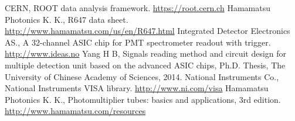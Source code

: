 \documentclass{nst}
\begin{document}
\begin{thebibliography}{99}
	 CERN,  ROOT data analysis framework. \href{https://root.cern.ch/}{https://root.cern.ch}
	 Hamamatsu Photonics K. K., R647 data sheet.
	\href{http://www.hamamatsu.com/us/en/R647.html}{http://www.hamamatsu.com/us/en/R647.html}
	 Integrated Detector Electronics AS., A 32-channel ASIC chip for PMT spectrometer readout with trigger. \href{http://www.ideas.no/products/ide3160-2/}{http://www.ideas.no}
	 Yang H B, Signals reading method and circuit design for multiple detection unit based on the advanced {ASIC} chips, Ph.D. Thesis, The University of Chinese Academy of Sciences, 2014.
	 National Instruments Co.,  National Instruments {VISA} library. \href{http://www.ni.com/visa/}{http://www.ni.com/visa}
	 Hamamatsu Photonics K. K., Photomultiplier tubes: basics and applications, 3rd edition.
	\href{http://www.hamamatsu.com/resources/pdf/etd/PMT_handbook_v3aE.pdf}{http://www.hamamatsu.com/resources}
\end{thebibliography}


%
\end{document}

